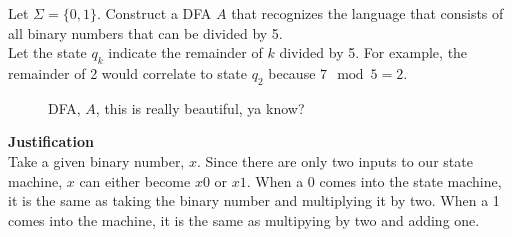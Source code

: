 \documentclass[]{mo-assignment}
\begin{document}
    \pagebreak

    \begin{problem}
        Let \(\Sigma = \{0, 1\}\). Construct a DFA \(A\) that recognizes the
        language that consists of all binary numbers that can be divided by 5.
        \\

        Let the state \(q_k\) indicate the remainder of \(k\) divided by 5. For
        example, the remainder of 2 would correlate to state \(q_2\) because \(7
        \mod 5 = 2\).

        \begin{figure}[h]
            \centering
                \caption{DFA, \(A\), this is really beautiful, ya know?}
                \label{fig:multiple5}
        \end{figure}

        \textbf{Justification}
        \\

        Take a given binary number, \(x\). Since there are only two inputs to our
        state machine, \(x\) can either become \(x0\) or \(x1\). When a 0 comes
        into the state machine, it is the same as taking the binary number and
        multiplying it by two. When a 1 comes into the machine, it is the same as
        multipying by two and adding one.
        \\


\end{problem}
\end{document}
